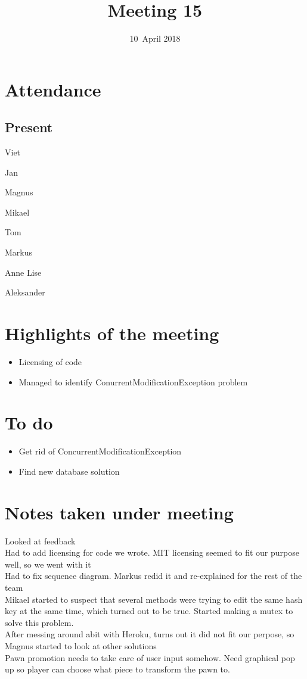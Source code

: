 \documentclass[letterpaper,11pt]{article}
\title{Meeting 15}
\date{10~April 2018}
\begin{document}
\maketitle
\section*{Attendance}
\subsection*{Present}
\begin{list}{}{}
	\item Viet
	\item Jan
	\item Magnus
	\item Mikael
	\item Tom
	\item Markus
	\item Anne Lise
	\item Aleksander
\end{list}

\newpage
\section*{Highlights of the meeting}
\begin{itemize}
	\item Licensing of code
	\item Managed to identify ConurrentModificationException problem
\end{itemize}

\section*{To do}
\begin{itemize}
	\item Get rid of ConcurrentModificationException
	\item Find new database solution
\end{itemize}

\section*{Notes taken under meeting}
Looked at feedback\\
Had to add licensing for code we wrote. MIT licensing seemed to fit our purpose well, so we went with it\\
Had to fix sequence diagram. Markus redid it and re-explained for the rest of the team\\
Mikael started to suspect that several methods were trying to edit the same hash key at the same time, which turned out to be true. Started making a mutex to solve this problem.\\
After messing around abit with Heroku, turns out it did not fit our perpose, so Magnus started to look at other solutions\\
Pawn promotion needs to take care of user input somehow. Need graphical pop up so player can choose what piece to transform the pawn to.
\end{document}
